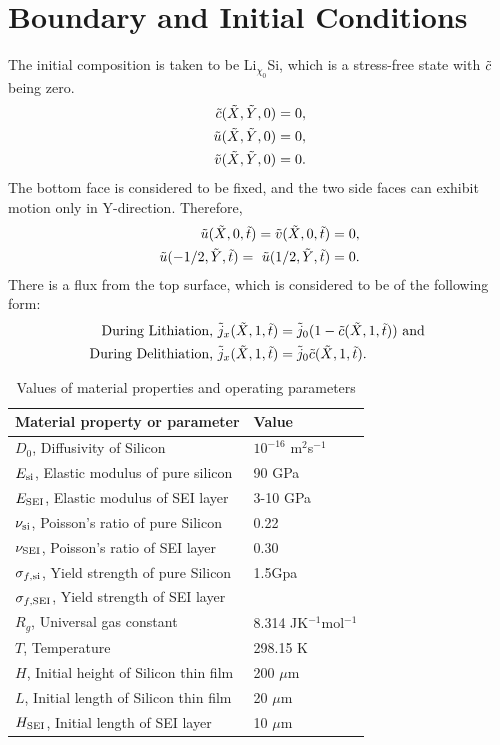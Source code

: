 \section{Boundary and Initial Conditions}
The initial composition is taken to be Li$_{\chi_{0}}$Si, which is a stress-free state with $\tilde{c}$ being zero.
\begin{align}
 \tilde{c}(\tilde{X}, \tilde{Y}, 0) = 0, \\
 \tilde{u}(\tilde{X}, \tilde{Y}, 0) = 0,\\
 \tilde{v}(\tilde{X}, \tilde{Y}, 0) = 0.
\end{align}
The bottom face is considered to be fixed, and the two side faces can exhibit motion only in Y-direction. Therefore,
\begin{align}
 \tu(\tX, 0, \tt) = \tv(\tX, 0, \tt) = 0, \\
\tu(-1/2, \tY, \tt) =  \tu(1/2, \tY, \tt) = 0.
\end{align}
There is a flux from the top surface, which is considered to be of the following form: 
\begin{align}
 \text{During Lithiation, }\tilde{j}_x(\tilde{X}, 1, \tilde{t}) &= \tilde{j}_0 (1 - \tilde{c}(\tilde{X}, 1, \tilde{t})) \text{ and } \\
 \text{During Delithiation, }\tilde{j}_x(\tilde{X}, 1, \tilde{t}) &= \tilde{j}_0 \tilde{c}(\tilde{X}, 1, \tilde{t}).
\end{align} 

\begin{table}[H]
\caption{Values of material properties and operating parameters}
\vspace{1em}
\begin{tabularx}{\textwidth}{Xl}
\hline
 {Material property or parameter} & {Value} \\
\hline
$D_0$, Diffusivity of Silicon & $10^{-16}$ m$^{2}$s$^{-1}$ \\
$E_{{\rm{si}}}$, Elastic modulus of pure silicon & 90 GPa \\
$E_{\rm{SEI}}$, Elastic modulus of SEI layer & 3-10 GPa \\
$\nu_{{\rm{si}}}$, Poisson's ratio of pure Silicon & 0.22\\
$\nu_{\rm{SEI}}$, Poisson's ratio of SEI layer & 0.30\\
$\sigma_{f,{\rm{si}}}$, Yield strength of pure Silicon & 1.5Gpa\\
$\sigma_{f, {\rm{SEI}}}$, Yield strength of SEI layer & \\
$R_g$, Universal gas constant & 8.314 JK$^{-1}$mol$^{-1}$\\
$T$, Temperature & 298.15 K\\
$H$, Initial height of Silicon thin film & 200 $\mu$m\\
$L$, Initial length of Silicon thin film & 20 $\mu$m\\
$H_{\rm{SEI}}$, Initial length of SEI layer & 10 $\mu$m
\end{tabularx}
\end{table}


